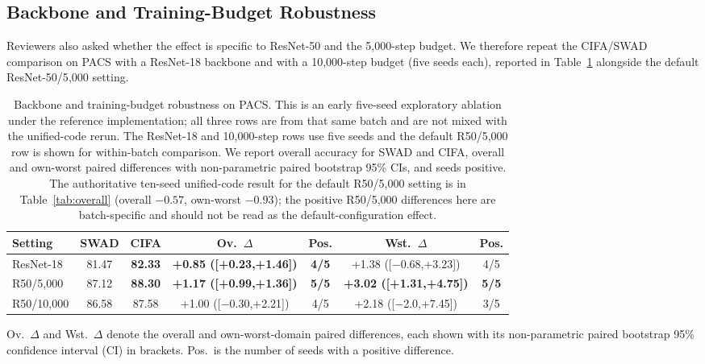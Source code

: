 \documentclass[electronics,article,submit,moreauthors]{Definitions/mdpi}
\newcommand{\add}[1]{\textcolor{addblue}{#1}}
\newcommand{\del}[1]{\textcolor{delred}{\st{#1}}}
\def\add#1{#1}%
\def\del#1{}%
\renewcommand{\add}[1]{#1}
\renewcommand{\del}[1]{}
\begin{document}
\subsection{Backbone and Training-Budget Robustness}

Reviewers also asked whether the effect is specific to ResNet-50 and the 5{,}000-step budget. We therefore repeat the CIFA/SWAD comparison on PACS with a ResNet-18 backbone and with a 10{,}000-step budget (five seeds each), reported in Table~\ref{tab:bbbudget} alongside the default ResNet-50/5{,}000 setting.
\begin{table}[H]
\caption{\del{Backbone and training-budget robustness on PACS. The ResNet-18 and 10{,}000-step rows use five seeds; the default ResNet-50/5{,}000 row is shown for reference. Overall accuracy for SWAD and CIFA, overall and own-worst-domain paired differences with non-parametric paired bootstrap 95\% CIs, and seeds positive. Bold intervals exclude zero.}\add{Backbone and training-budget robustness on PACS. This is an early five-seed exploratory ablation under the reference implementation; all three rows are from that same batch and are not mixed with the unified-code rerun. The ResNet-18 and 10{,}000-step rows use five seeds and the default R50/5{,}000 row is shown for within-batch comparison. We report overall accuracy for SWAD and CIFA, overall and own-worst paired differences with non-parametric paired bootstrap 95\% CIs, and seeds positive. The authoritative ten-seed unified-code result for the default R50/5{,}000 setting is in Table~\protect\ref{tab:overall} (overall $-0.57$, own-worst $-0.93$); the positive R50/5{,}000 differences here are batch-specific and should not be read as the default-configuration effect.}}
\label{tab:bbbudget}
\setlength{\tabcolsep}{4.5pt}
\begin{tabular}{lcccccc}
\toprule
\textbf{Setting} & \textbf{SWAD} & \textbf{CIFA} & \textbf{Ov.\ $\Delta$} & \textbf{Pos.} & \textbf{Wst.\ $\Delta$} & \textbf{Pos.}\\
\midrule
ResNet-18 & 81.47 & \textbf{82.33} & \textbf{+0.85 ([+0.23,+1.46])} & \textbf{4/5} & +1.38 ([$-$0.68,+3.23]) & 4/5\\
R50/5{,}000 & 87.12 & \textbf{88.30} & \textbf{+1.17 ([+0.99,+1.36])} & \textbf{5/5} & \textbf{+3.02 ([+1.31,+4.75])} & \textbf{5/5}\\
R50/10{,}000 & 86.58 & 87.58 & +1.00 ([$-$0.30,+2.21]) & 4/5 & +2.18 ([$-$2.0,+7.45]) & 3/5\\
\bottomrule
\end{tabular}
\vspace{2pt}
\footnotesize Ov.\ $\Delta$ and Wst.\ $\Delta$ denote the overall and own-worst-domain paired differences, each shown with its non-parametric paired bootstrap 95\% confidence interval (CI) in brackets. Pos.\ is the number of seeds with a positive difference.
\end{table}
\end{document}
